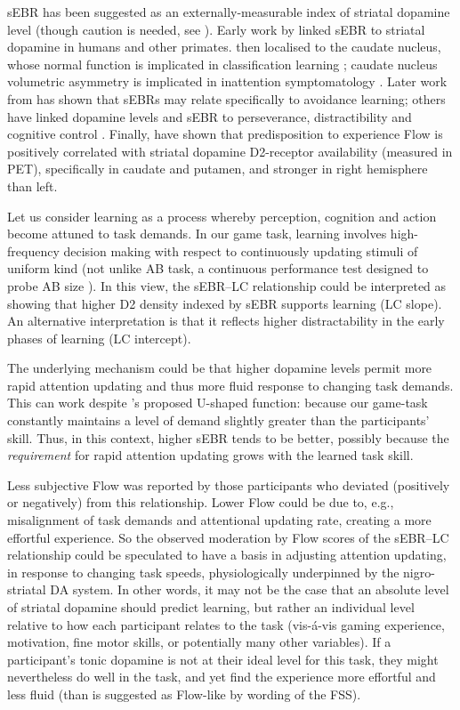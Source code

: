 \documentclass[10pt,letterpaper,floatsintext]{article}
\begin{document}
sEBR has been suggested as an externally-measurable index of striatal dopamine level (though caution is needed, see \cite{dang2017spontaneous}). Early work by \cite{Karson1983} linked sEBR to striatal dopamine in humans and other primates. \cite{Taylor1999} then localised to the caudate nucleus, whose normal function is implicated in classification learning \cite{Seger2005}; caudate nucleus volumetric asymmetry is implicated in inattention symptomatology \cite{Schrimsher2002}. Later work from \cite{Slagter2015} has shown that sEBRs may relate specifically to avoidance learning; others have linked dopamine levels and sEBR to perseverance, distractibility and cognitive control \cite{Muller2007,Dreisbach2005}. Finally, \cite{DeManzano2013} have shown that  predisposition to experience Flow is positively correlated with striatal dopamine D2-receptor availability (measured in PET), specifically in caudate and putamen, and stronger in right hemisphere than left.

Let us consider learning as a process whereby perception, cognition and action become attuned to task demands. In our game task, learning involves high-frequency decision making with respect to continuously updating stimuli of uniform kind (not unlike AB task, a continuous performance test designed to probe AB size \cite{Slagter2012}). In this view, the sEBR--LC relationship could be interpreted as showing that higher D2 density indexed by sEBR supports learning (LC slope). An alternative interpretation is that it reflects higher distractability in the early phases of learning (LC intercept).

The underlying mechanism could be that higher dopamine levels permit more rapid attention updating and thus more fluid response to changing task demands. This can work despite \cite{Slagter2012}'s proposed U-shaped function: because our game-task constantly maintains a level of demand slightly greater than the participants' skill. Thus, in this context, higher sEBR tends to be better, possibly because the {\it requirement} for rapid attention updating grows with the learned task skill.

Less subjective Flow was reported by those participants who deviated (positively or negatively) from this relationship. Lower Flow could be due to, e.g., misalignment of task demands and attentional updating rate, creating a more effortful experience. So the observed moderation by Flow scores of the sEBR--LC relationship could be speculated to have a basis in adjusting attention updating, in response to changing task speeds, physiologically underpinned by the nigro-striatal DA system. In other words, it may not be the case that an absolute level of striatal dopamine should predict learning, but rather an individual level relative to how each participant relates to the task (vis-\'{a}-vis gaming experience, motivation, fine motor skills, or potentially many other variables). If a participant's tonic dopamine is not at their ideal level for this task, they might nevertheless do well in the task, and yet find the experience more effortful and less fluid (than is suggested as Flow-like by wording of the FSS).
\end{document}
